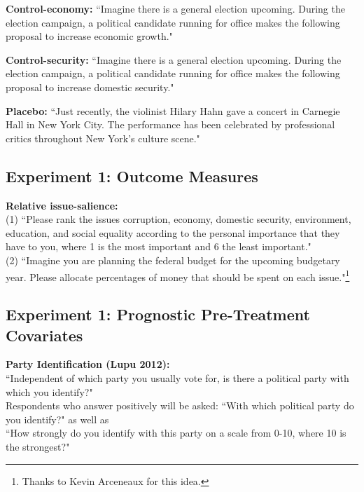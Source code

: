 \documentclass[11pt]{article}
\begin{document}
\textbf{Control-economy:}
“Imagine there is a general election upcoming. During the election campaign, a political candidate running for office makes the following proposal to increase economic growth."

\textbf{Control-security:}
“Imagine there is a general election upcoming. During the election campaign, a political candidate running for office makes the following proposal to increase domestic security."

\textbf{Placebo:}
“Just recently, the violinist Hilary Hahn gave a concert in Carnegie Hall in New York City. The performance has been celebrated by professional critics throughout New York's culture scene."

\subsection{Experiment 1: Outcome Measures}
\textbf{Relative issue-salience:}\\
(1) “Please rank the issues corruption, economy, domestic security, environment, education, and social equality according to the personal importance that they have to you, where 1 is the most important and 6 the least important."\\
(2) “Imagine you are planning the federal budget for the upcoming budgetary year. Please allocate percentages of money that should be spent on each issue."\footnote{Thanks to Kevin Arceneaux for this idea.}

\subsection{Experiment 1: Prognostic Pre-Treatment Covariates}
\textbf{Party Identification (Lupu 2012):}\\
“Independent of which party you usually vote for, is there a political party with which you identify?"\\
Respondents who answer positively will be asked: “With which political party do you identify?" as well as\\
“How strongly do you identify with this party on a scale from 0-10, where 10 is the strongest?"
\end{document}
